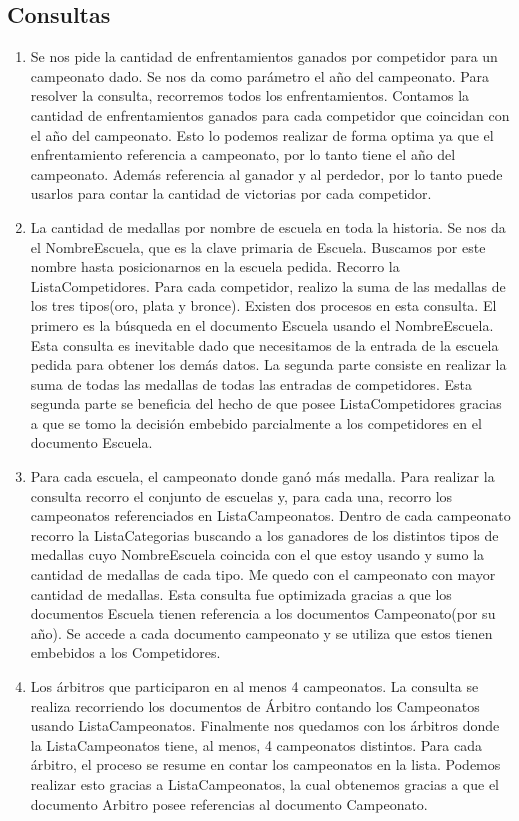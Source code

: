 \subsection{Consultas}
\begin{enumerate}
\item Se nos pide la cantidad de enfrentamientos ganados por competidor para un campeonato dado. Se nos da como parámetro
el año del campeonato. Para resolver la consulta, recorremos todos los enfrentamientos. Contamos la cantidad de
enfrentamientos ganados para cada competidor que coincidan con el año del campeonato. Esto lo podemos realizar de forma optima
ya que el enfrentamiento referencia a campeonato, por lo tanto tiene el año del campeonato. Además referencia al ganador y al
perdedor, por lo tanto puede usarlos para contar la cantidad de victorias por cada competidor. 

\item La cantidad de medallas por nombre de escuela en toda la historia. Se nos da el NombreEscuela, que es la clave primaria de Escuela.
Buscamos por este nombre hasta posicionarnos en la escuela pedida. Recorro la ListaCompetidores. Para cada competidor, realizo la suma de las medallas de los
tres tipos(oro, plata y bronce). Existen dos procesos en esta consulta. El primero es la búsqueda en el documento Escuela
usando el NombreEscuela. Esta consulta es inevitable dado que necesitamos de la entrada de la escuela pedida para obtener
los demás datos. La segunda parte consiste en realizar la suma de todas las medallas de todas las entradas de
competidores. Esta segunda parte se beneficia del hecho de que posee ListaCompetidores gracias a que se tomo la decisión
embebido parcialmente a los competidores en el documento Escuela.

\item Para cada escuela, el campeonato donde ganó más medalla. Para realizar la consulta recorro el conjunto de
escuelas y, para cada una, recorro los campeonatos referenciados en ListaCampeonatos. Dentro de cada
campeonato recorro la ListaCategorias buscando a los ganadores de los distintos tipos de medallas cuyo NombreEscuela
coincida con el que estoy usando y sumo la cantidad de medallas de cada tipo. Me quedo con el campeonato con mayor
cantidad de medallas. Esta consulta fue optimizada gracias a que los documentos Escuela tienen referencia a los documentos
Campeonato(por su año). Se accede a cada documento campeonato y se utiliza que estos tienen embebidos a los Competidores.

\item Los árbitros que participaron en al menos 4 campeonatos. La consulta se realiza recorriendo los documentos
de Árbitro contando los Campeonatos usando ListaCampeonatos. Finalmente nos quedamos con los árbitros donde la ListaCampeonatos
tiene, al menos, 4 campeonatos distintos. Para cada árbitro, el proceso se resume en contar los campeonatos en la lista.
Podemos realizar esto gracias a ListaCampeonatos, la cual obtenemos gracias a que el documento Arbitro posee referencias
al documento Campeonato.


\end{enumerate}
